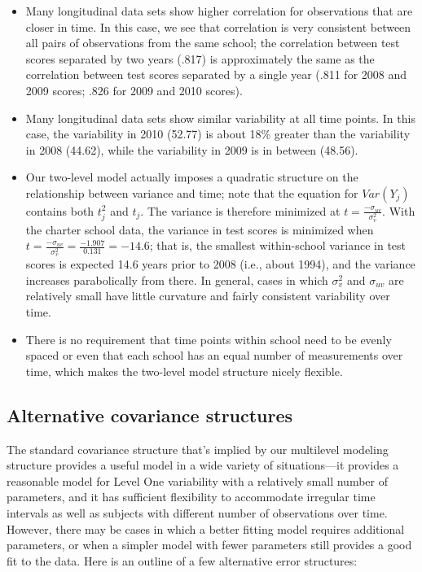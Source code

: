 \documentclass[
]{krantz}
\providecommand{\tightlist}{%
  \setlength{\itemsep}{0pt}\setlength{\parskip}{0pt}}
\begin{document}
\begin{itemize}
\tightlist
\item
  Many longitudinal data sets show higher correlation for observations that are closer in time. In this case, we see that correlation is very consistent between all pairs of observations from the same school; the correlation between test scores separated by two years (.817) is approximately the same as the correlation between test scores separated by a single year (.811 for 2008 and 2009 scores; .826 for 2009 and 2010 scores).
\item
  Many longitudinal data sets show similar variability at all time points. In this case, the variability in 2010 (52.77) is about 18\% greater than the variability in 2008 (44.62), while the variability in 2009 is in between (48.56).
\item
  Our two-level model actually imposes a quadratic structure on the relationship between variance and time; note that the equation for \(Var(Y_{j})\) contains both \(t^{2}_{j}\) and \(t_{j}\). The variance is therefore minimized at \(t=\frac{-\sigma_{uv}}{\sigma^{2}_{v}}\). With the charter school data, the variance in test scores is minimized when \(t=\frac{-\sigma_{uv}}{\sigma^{2}_{v}}=\frac{-1.907}{0.131}=-14.6\); that is, the smallest within-school variance in test scores is expected 14.6 years prior to 2008 (i.e., about 1994), and the variance increases parabolically from there. In general, cases in which \(\sigma^{2}_{v}\) and \(\sigma_{uv}\) are relatively small have little curvature and fairly consistent variability over time.
\item
  There is no requirement that time points within school need to be evenly spaced or even that each school has an equal number of measurements over time, which makes the two-level model structure nicely flexible.
\end{itemize}

\hypertarget{alternateerror}{%
\subsection{Alternative covariance structures}\label{alternateerror}}

The standard covariance structure that's implied by our multilevel modeling structure provides a useful model in a wide variety of situations---it provides a reasonable model for Level One variability with a relatively small number of parameters, and it has sufficient flexibility to accommodate irregular time intervals as well as subjects with different number of observations over time. However, there may be cases in which a better fitting model requires additional parameters, or when a simpler model with fewer parameters still provides a good fit to the data. Here is an outline of a few alternative error structures:
\end{document}
